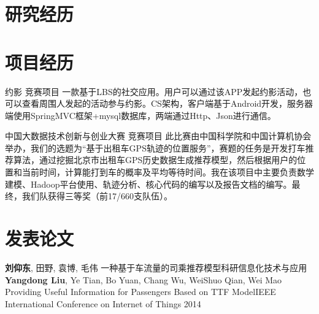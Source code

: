 \documentclass[11pt,a4paper]{moderncv}
\begin{document}
\section{研究经历}
\vspace*{0.2\baselineskip}

\section{项目经历}
\renewcommand{\baselinestretch}{1.2}
\vspace*{0.2\baselineskip}
{约影}
{}
{竞赛项目}{}
{一款基于LBS的社交应用。用户可以通过该APP发起约影活动，也可以查看周围人发起的活动参与约影。CS架构，客户端基于Android开发，服务器端使用SpringMVC框架+mysql数据库，两端通过Http、Json进行通信。}

\vspace*{0.2\baselineskip}
{中国大数据技术创新与创业大赛}
{}
{竞赛项目}{}
{此比赛由中国科学院和中国计算机协会举办，我们的选题为“基于出租车GPS轨迹的位置服务”，赛题的任务是开发打车推荐算法，通过挖掘北京市出租车GPS历史数据生成推荐模型，然后根据用户的位置和当前时间，计算能打到车的概率及平均等待时间。我在该项目中主要负责数学建模、Hadoop平台使用、轨迹分析、核心代码的编写以及报告文档的编写。最终，我们队获得三等奖（前17/660支队伍）。}




\renewcommand{\baselinestretch}{1.0}

\section{发表论文}
{\textbf{刘仰东}\textnormal{, 田野, 袁博, 毛伟}}
{一种基于车流量的司乘推荐模型}{科研信息化技术与应用}
{}{}{}
{\textbf{Yangdong Liu}\textnormal{, Ye Tian, Bo Yuan, Chang Wu, WeiShuo Qian, Wei Mao}}
{Providing Useful Information for Passengers Based on TTF Model}{IEEE International Conference on Internet of Things 2014}
{}{}{}
\end{document}
